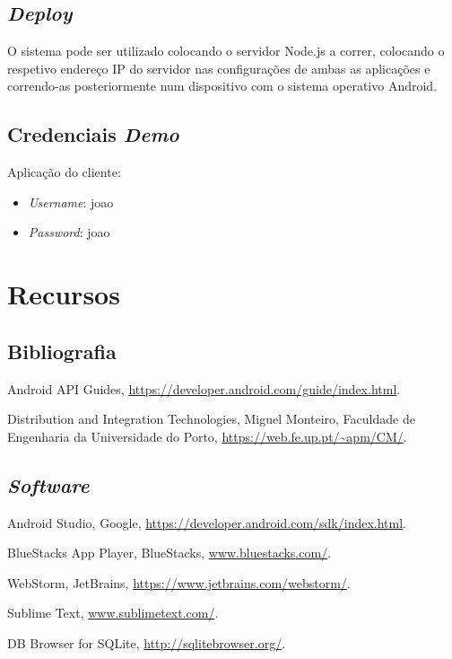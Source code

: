 \documentclass[12pt]{article}
\begin{document}
\subsection*{\textit{Deploy}}

O sistema pode ser utilizado colocando o servidor Node.js a correr, colocando o respetivo endereço IP do servidor nas configurações de ambas as aplicações e correndo-as posteriormente num dispositivo com o sistema operativo Android.

\subsection*{Credenciais \textit{Demo}}

Aplicação do cliente:
\begin{itemize}
	\item \textit{Username}: joao
	\item \textit{Password}: joao
\end{itemize}

\section{Recursos}

\subsection{Bibliografia}
\begin{description}
	\item Android API Guides, \url{https://developer.android.com/guide/index.html}.
	\item Distribution and Integration Technologies, Miguel Monteiro, Faculdade de Engenharia da Universidade do Porto, \url{https://web.fe.up.pt/~apm/CM/}.
\end{description}
\subsection{\it{Software}}
\begin{description}
	\item Android Studio, Google, \url{https://developer.android.com/sdk/index.html}.
	\item BlueStacks App Player, BlueStacks, \url{www.bluestacks.com/}.
	\item WebStorm, JetBrains, \url{https://www.jetbrains.com/webstorm/}.
	\item Sublime Text, \url{www.sublimetext.com/}.
	\item DB Browser for SQLite, \url{http://sqlitebrowser.org/}.
\end{description}
\end{document}
